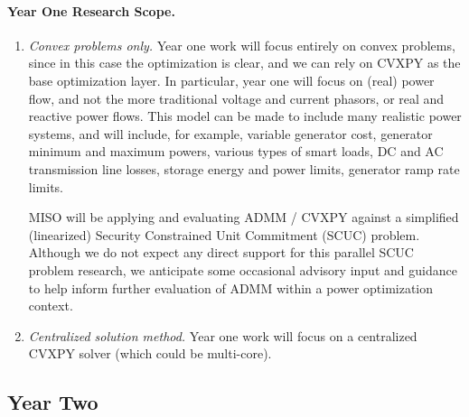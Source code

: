 \documentclass[12pt]{article}
\begin{document}
\paragraph{Year One Research Scope.}
\begin{enumerate}
\item \emph{Convex problems only.}
Year one work will focus entirely on convex problems,
since in this case the optimization is clear,
and we can rely on CVXPY as the base optimization layer.
In particular, year one will focus on (real) power flow,
and not the more traditional voltage and current phasors,
or real and reactive power flows.
This model can be made to include many realistic power systems,
and will include, for example, variable generator cost,
generator minimum and maximum powers,
various types of smart loads, DC and AC transmission line losses,
storage energy and power limits,
generator ramp rate limits.

MISO will be applying and evaluating ADMM / CVXPY
against a simplified (linearized) Security Constrained
Unit Commitment (SCUC) problem.
Although we do not expect any direct support for
this parallel SCUC problem research,
we anticipate some occasional advisory input and guidance
to help inform further evaluation of ADMM within a power 
optimization context.

\item \emph{Centralized solution method.}
Year one work will focus on a centralized CVXPY solver 
(which could be multi-core).
\end{enumerate}

\subsection{Year Two}
\end{document}
